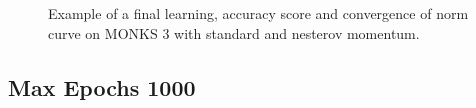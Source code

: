 \begin{appendices}
\begin{figure}[H]
\begin{subfigure}{0.40\textwidth}
                \end{subfigure}
                \begin{subfigure}{0.40\textwidth}
                    \caption{}
                    \label{fig:monks_3_NORM_SGD}
                \end{subfigure}
                \caption{Example of a final learning, accuracy score and convergence of norm curve on MONKS 3 with standard and nesterov momentum.}
                \label{fig:monks_3_SGD}
            \end{figure}

            \subsection{Max Epochs 1000}


\end{appendices}
